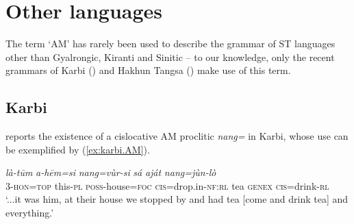 \documentclass[oneside,a4paper,11pt]{article}
\newcommand{\ipa}[1]{{\phon\textit{#1}}}
\newcommand{\zh}[1]{{\cn #1}}
\newcommand{\rouge}[1]{{\color{red}#1}}
\newcommand{\gray}[1]{\cellcolor{lightgray!30}{#1}}
\newcommand{\lightgray}[1]{\cellcolor{lightgray!15}{#1}}
\begin{document}
% 

\section{Other languages}
The term `AM' has rarely been used to describe the grammar of ST languages other than Gyalrongic, Kiranti and Sinitic -- to our knowledge, only the recent grammars of Karbi (\citet{konnerth14karbi}) and Hakhun Tangsa (\citet{boro17hakhun}) make use of this term.


\subsection{Karbi}
\citet{konnerth14karbi, konnerth15cisloc} reports the existence of a cislocative AM proclitic \ipa{nang=} in Karbi, whose use can be exemplified by (\ref{ex:karbi.AM}).

\begin{exe}
\ex \label{ex:karbi.AM}
\gll \ipa{alàng-lì=ke}	\ipa{là-tūm}	\ipa{a-hēm=si}	\ipa{\rouge{nang}=vùr-si}	\ipa{sá}	\ipa{aját}	\ipa{\rouge{nang}=jùn-lò} \\
 3-\textsc{hon}=\textsc{top} this-\textsc{pl} \textsc{poss}-house=\textsc{foc} \rouge{\textsc{cis}}=drop.in-\textsc{nf}:\textsc{rl} tea \textsc{genex} \rouge{\textsc{cis}}=drink-\textsc{rl} \\
 \glt `...it was him, at their house we stopped by and had tea [{come} and drink tea] and everything.'
\end{exe}
\end{document}
